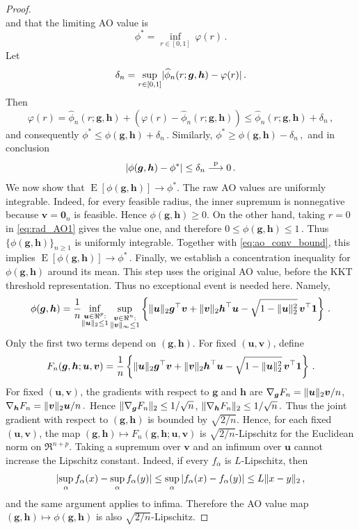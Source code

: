 \documentclass{article}
\makeatletter
\DeclareMathOperator{\expect}{E}
\theoremstyle{definition}
\newcommand{\vnorm}[1]{%
	\ensuremath{%
		\if@display
		\left\| #1 \right\|
		\else
		\| #1 \|
		\fi
	}%
}
\newcommand{\abs}[1]{%
	\ensuremath{%
		\if@display
		\left| #1 \right|
		\else
		\lvert #1 \rvert
		\fi
	}%
}
\newcommand*{\bb}{\boldsymbol}
\def\bu{\bb{u}}
\def\bv{\bb{v}}
\def\bh{\bb{h}}
\def\bg{\bb{g}}
\makeatother
\begin{document}
\begin{bibunit}
\begin{proof}
$$	$$
and that the limiting AO value is
$$
    \phi^* = \underset{r \in [0,1]}{\inf} \,  \varphi(r) \,.
$$
	Let
	$$
	\delta_n =
	\underset{r \in [0,1]}{\sup}
	\abs{\widehat\phi_n(r;\bg,\bh)-\varphi(r)} \,.
	$$
	Then
	$$
	\varphi(r) = \widehat\phi_n(r;\bg,\bh) + (\varphi(r) - \widehat\phi_n(r;\bg,\bh)) \leq \widehat\phi_n(r;\bg,\bh) + \delta_n \,,
	$$
	and consequently $\phi^* \leq  \phi(\bg,\bh) + \delta_n \,.$
	Similarly, $\phi^* \geq  \phi(\bg,\bh) - \delta_n \,,$
	and in conclusion
	\begin{equation}
		\label{eq:ao_conv_bound}
		\abs{\phi(\bg,\bh)-\phi^*}\leq \delta_n \overset{\mathrm p}{\longrightarrow}0 \,.
	\end{equation}
	We now show that $\expect[\phi(\bg,\bh)]\to\phi^*$. The raw AO values are
	uniformly integrable. Indeed, for every feasible radius, the inner supremum is
	nonnegative because $\bv=\bb 0_n$ is feasible. Hence
	$\phi(\bg,\bh)\geq0$. On the other hand, taking $r=0$ in
	\eqref{eq:rad_AO1} gives the value one, and therefore $0\leq \phi(\bg,\bh)\leq 1\,.$
	Thus $\{\phi(\bg,\bh)\}_{n\geq1}$ is uniformly integrable. Together with
	\eqref{eq:ao_conv_bound}, this implies $\expect[\phi(\bg,\bh)]\to \phi^* \,.$
	Finally, we establish a concentration inequality for $\phi(\bg,\bh)$ around
	its mean. This step uses the original AO value, before the KKT threshold
	representation. Thus no exceptional event is needed here. Namely,
	$$
	\phi(\bg,\bh)
	=
	\frac{1}{n}
	\underset{\substack{\bu \in \Re^p:\\ \vnorm{\bu}_2 \leq 1}}{\inf}
	\,
	\underset{\substack{\bv \in \Re^n:\\ \vnorm{\bv}_\infty \leq 1}}{\sup}
	\left\{
	\vnorm{\bu}_2 \bg^\top\bv
	+
	\vnorm{\bv}_2 \bh^\top\bu
	-
	\sqrt{1-\vnorm{\bu}_2^2}\,\bv^\top\bb 1
	\right\} \,. 
	$$
	Only the first two terms depend on $(\bg,\bh)$. For fixed
	$(\bu,\bv)$, define
	$$
	F_n(\bg,\bh;\bu,\bv)
	=
	\frac{1}{n}
	\left\{
	\vnorm{\bu}_2 \bg^\top\bv
	+
	\vnorm{\bv}_2 \bh^\top\bu
	-
	\sqrt{1-\vnorm{\bu}_2^2}\,\bv^\top\bb 1
	\right\} \,. 
	$$
		For fixed $(\bu,\bv)$, the gradients with respect to $\bg$ and $\bh$
		are $\nabla_{\bg}F_n = \vnorm{\bu}_2\bv/n$, $\nabla_{\bh}F_n = \vnorm{\bv}_2\bu/n\,.$
		Hence $\vnorm{\nabla_{\bg}F_n}_2 \leq 1/\sqrt n$, $\vnorm{\nabla_{\bh}F_n}_2 \leq 1/\sqrt n\,.$
	Thus the joint gradient with respect to $(\bg,\bh)$ is bounded by
	$\sqrt{2/n}$. Hence, for each fixed $(\bu,\bv)$, the map
	$(\bg,\bh)\mapsto F_n(\bg,\bh;\bu,\bv)$ is $\sqrt{2/n}$-Lipschitz for the
	Euclidean norm on $\Re^{n+p}$. Taking a supremum over $\bv$ and an
	infimum over $\bu$ cannot increase the Lipschitz constant. Indeed, if every
	$f_\alpha$ is $L$-Lipschitz, then
	$$
	\abs{
	\underset{\alpha}{\sup}\, f_\alpha(x)
	-
	\underset{\alpha}{\sup}\, f_\alpha(y)
	}
	\leq
	\underset{\alpha}{\sup}\,\abs{f_\alpha(x)-f_\alpha(y)}
	\leq
	L\vnorm{x-y}_2\,,
	$$
	and the same argument applies to infima. Therefore the AO value map $(\bg,\bh)\mapsto\phi(\bg,\bh)$
	is also $\sqrt{2/n}$-Lipschitz.
	

\end{proof}
\end{bibunit}
\end{document}

